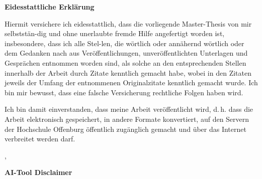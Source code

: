 \clearpage
\thispagestyle{empty}
\textsf{\large\textbf{Eidesstattliche Erklärung}}

Hiermit versichere ich eidesstattlich, dass die vorliegende Master-Thesis von mir selbststän-dig und ohne unerlaubte fremde Hilfe angefertigt worden ist, insbesondere, dass ich alle Stel-len, die wörtlich oder annähernd wörtlich oder dem Gedanken nach aus Veröffentlichungen, unveröffentlichten Unterlagen und Gesprächen entnommen worden sind, als solche an den entsprechenden Stellen innerhalb der Arbeit durch Zitate kenntlich gemacht habe, wobei in den Zitaten jeweils der Umfang der entnommenen Originalzitate kenntlich gemacht wurde. Ich bin mir bewusst, dass eine falsche Versicherung rechtliche Folgen haben wird.

Ich bin damit einverstanden, dass meine Arbeit veröffentlicht wird, d.\,h. dass die Arbeit elektronisch gespeichert, in andere Formate konvertiert, auf den Servern der Hochschule Offenburg öffentlich zugänglich gemacht und über das Internet verbreitet werden darf.



\vspace{1cm}
\hsmaort, \hsmadatum \\
\hsmaautor

\vspace{2.5cm}

\textsf{\large\textbf{AI-Tool Disclaimer}}


